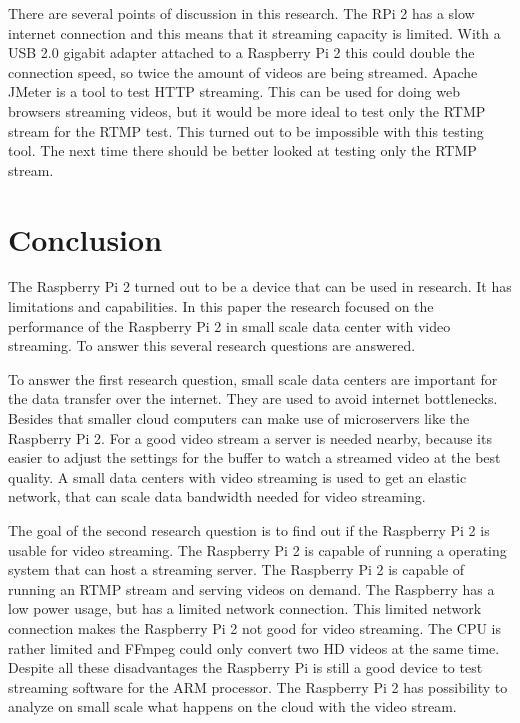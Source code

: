 \documentclass{sig-alternate-br}
\begin{document}
There are several points of discussion in this research. The RPi 2 has a slow internet connection and this means that it streaming capacity is limited. With a USB 2.0 gigabit adapter attached to a Raspberry Pi 2 this could  double the connection speed, so twice the amount of videos are being streamed. \newline
Apache JMeter is a tool to test HTTP streaming. This can be used for doing web browsers streaming videos, but it would be more ideal to test only the RTMP stream for the RTMP test.  This turned out to be impossible with this testing tool. The next time there should be better looked at testing only the RTMP stream. 


\section{Conclusion}
The Raspberry Pi 2 turned out to be a device that can be used in research. It has limitations and capabilities. In this paper the research focused on the performance of the Raspberry Pi 2 in small scale data center with video streaming. To answer this several research questions are answered.

To answer the first research question, small scale data centers are important for the data transfer over the internet. They are used to avoid internet bottlenecks. Besides that smaller cloud computers can make use of microservers like the Raspberry Pi 2. For a good video stream a server is needed nearby, because its easier to adjust the settings for the buffer to watch a streamed video at the best quality. A small data centers with video streaming is used to get an elastic network, that can scale data bandwidth needed for video streaming. 

The goal of the second research question is to find out if the Raspberry Pi 2 is usable for video streaming. The Raspberry Pi 2 is capable of running a operating system that can host a streaming server. The Raspberry Pi 2 is capable of running an RTMP stream and serving videos on demand. The Raspberry has a low power usage, but has a limited network connection. This limited network connection makes the Raspberry Pi 2 not good for video streaming. The CPU is rather limited and FFmpeg could only convert two HD videos at the same time. Despite all these disadvantages the Raspberry Pi is still a good device to test streaming software for the ARM processor. The Raspberry Pi 2 has possibility to analyze on small scale what happens on the cloud with the video stream.
\end{document}
